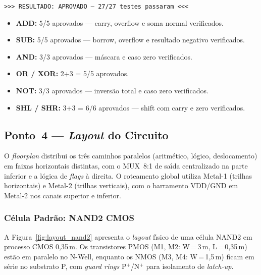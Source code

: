 \documentclass[12pt,a4paper]{article}
\begin{document}
\begin{resultbox}
\begin{center}
\texttt{>>> RESULTADO: APROVADO --- 27/27 testes passaram <<<}
\end{center}
\begin{itemize}[leftmargin=1.5em]
  \item \textbf{ADD:} 5/5 aprovados --- carry, overflow e soma normal verificados.
  \item \textbf{SUB:} 5/5 aprovados --- borrow, overflow e resultado negativo verificados.
  \item \textbf{AND:} 3/3 aprovados --- m\'{a}scara e caso zero verificados.
  \item \textbf{OR / XOR:} 2+3 = 5/5 aprovados.
  \item \textbf{NOT:} 3/3 aprovados --- invers\~{a}o total e caso zero verificados.
  \item \textbf{SHL / SHR:} 3+3 = 6/6 aprovados --- shift com carry e zero verificados.
\end{itemize}
\end{resultbox}

\subsection{Ponto~4 --- \textit{Layout} do Circuito}
\label{sec:layout}

O \textit{floorplan} distribui os tr\^{e}s caminhos paralelos (aritm\'{e}tico, l\'{o}gico, deslocamento) em faixas horizontais distintas, com o MUX~8:1 de sa\'{\i}da centralizado na parte inferior e a l\'{o}gica de \textit{flags} \`{a} direita. O roteamento global utiliza Metal-1 (trilhas horizontais) e Metal-2 (trilhas verticais), com o barramento VDD/GND em Metal-2 nos canais superior e inferior.

\subsubsection{C\'{e}lula Padr\~{a}o: NAND2 CMOS}

A Figura~\ref{fig:layout_nand2} apresenta o \textit{layout} f\'{\i}sico de uma c\'{e}lula NAND2 em processo CMOS 0,35\,\textmu m. Os transistores PMOS (M1, M2: W\,=\,3\,\textmu m, L\,=\,0,35\,\textmu m) est\~{a}o em paralelo no N-Well, enquanto os NMOS (M3, M4: W\,=\,1,5\,\textmu m) ficam em s\'{e}rie no substrato P, com \textit{guard rings} P$^{+}$/N$^{+}$ para isolamento de \textit{latch-up}.
\end{document}
